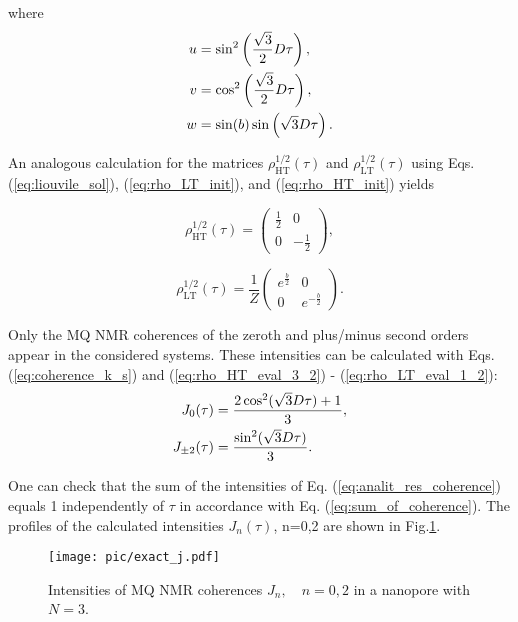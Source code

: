 where
\begin{align}
    u & =  \sin^2\left(\frac{\sqrt{3}}{2}D\tau\right), \notag \\
    v & =  \cos^2\left(\frac{\sqrt{3}}{2}D\tau\right), \notag \\
    w & =  \sin(b)\sin\left(\sqrt{3}D\tau\right). 
\end{align}

An analogous calculation for the matrices $\rho^{1/2}_\mathrm{HT} (\tau)$ and $\rho^{1/2}_\mathrm{LT} (\tau)$ using Eqs.   (\ref{eq:liouvile_sol}), (\ref{eq:rho_LT_init}), and (\ref{eq:rho_HT_init}) yields

\begin{equation}
    \label{eq:rho_HT_eval_1_2}
    \rho_\mathrm{HT}^{1/2}(\tau) = 
    \begin{pmatrix}
            \frac 1 2  
        & 
            0  
        \\
            0
        & 
            -\frac 1 2   
    \end{pmatrix},
\end{equation}

\begin{equation}
\label{eq:rho_LT_eval_1_2}
    \rho_\mathrm{LT}^{1/2}(\tau) = \frac 1 Z 
    \begin{pmatrix}
            e^{\frac b 2}
        & 
            0  
        \\
            0
        & 
            e^{-\frac b 2}  
    \end{pmatrix}.
\end{equation}

Only the MQ NMR coherences of the zeroth and plus/minus second orders appear in the considered systems. These intensities can be calculated with Eqs.   (\ref{eq:coherence_k_s}) and (\ref{eq:rho_HT_eval_3_2}) - (\ref{eq:rho_LT_eval_1_2}):
\begin{align}
    \label{eq:analit_res_coherence}
    J_0(\tau) & = \dfrac{2\cos^2(\sqrt{3}D\tau) + 1}{3}, \notag \\
    J_{\pm 2}(\tau) & = \dfrac{\sin^2(\sqrt{3}D\tau)}{3} .
\end{align}

One can check that the sum of the intensities of Eq.   (\ref{eq:analit_res_coherence}) equals 1 independently of $\tau$ in accordance with Eq.   (\ref{eq:sum_of_coherence}). The profiles of the calculated intensities $J_n(\tau)$, n=0,2 are shown in Fig.\ref{fig:exact_j}.
\begin{figure}
    \centering
    \texttt{[image: pic/exact\_j.pdf]}
    \caption{Intensities of MQ NMR coherences $J_n, \quad n=0, 2$ in a nanopore with $N = 3$.}
    \label{fig:exact_j}
\end{figure}
